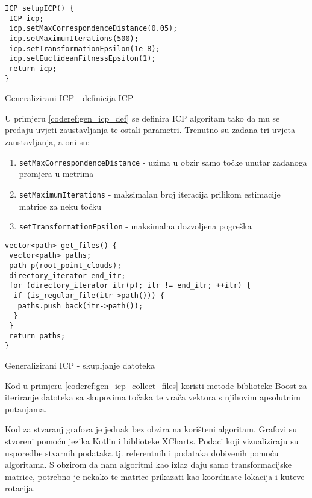 \begin{listing}[h!]
  \begin{verbatim}
ICP setupICP() {
 ICP icp;
 icp.setMaxCorrespondenceDistance(0.05);
 icp.setMaximumIterations(500);
 icp.setTransformationEpsilon(1e-8);
 icp.setEuclideanFitnessEpsilon(1);
 return icp;
}
  \end{verbatim}
  \caption{Generalizirani ICP - definicija ICP}
  \label{coderef:gen_icp_def}
\end{listing}

U primjeru \ref{coderef:gen_icp_def} se definira ICP algoritam tako da mu se predaju uvjeti zaustavljanja te ostali parametri. Trenutno su zadana tri uvjeta zaustavljanja, a oni su:

\begin{enumerate}
  \item \texttt{setMaxCorrespondenceDistance} - uzima u obzir samo točke unutar zadanoga promjera u metrima
  \item \texttt{setMaximumIterations} - maksimalan broj iteracija prilikom estimacije matrice za neku točku
  \item \texttt{setTransformationEpsilon} - maksimalna dozvoljena pogreška
\end{enumerate}

\begin{listing}[h!]
  \begin{verbatim}
vector<path> get_files() {
 vector<path> paths;
 path p(root_point_clouds);
 directory_iterator end_itr;
 for (directory_iterator itr(p); itr != end_itr; ++itr) {
  if (is_regular_file(itr->path())) {
   paths.push_back(itr->path());
  }
 }
 return paths;
}
  \end{verbatim}
  \caption{Generalizirani ICP - skupljanje datoteka}
  \label{coderef:gen_icp_collect_files}
\end{listing}

Kod u primjeru \ref{coderef:gen_icp_collect_files} koristi metode biblioteke Boost za iteriranje datoteka sa skupovima točaka te vrača vektora s njihovim apsolutnim putanjama.

Kod za stvaranj grafova je jednak bez obzira na korišteni algoritam. Grafovi su stvoreni pomoću jezika Kotlin i biblioteke XCharts. Podaci koji vizualiziraju su usporedbe stvarnih podataka tj. referentnih i podataka dobivenih pomoću algoritama. S obzirom da nam algoritmi kao izlaz daju samo transformacijske matrice, potrebno je nekako te matrice prikazati kao koordinate lokacija i kuteve rotacija.

